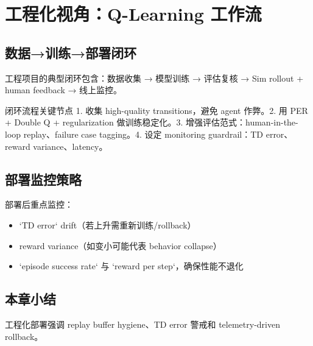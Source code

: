 \section{工程化视角：Q-Learning 工作流}

\subsection{数据→训练→部署闭环}

工程项目的典型闭环包含：数据收集 → 模型训练 → 评估复核 → Sim rollout + human feedback → 线上监控。

\begin{importantbox}{闭环流程关键节点}
1. 收集 high-quality transitions，避免 agent 作弊。2. 用 PER + Double Q + regularization 做训练稳定化。3. 增强评估范式：human-in-the-loop replay、failure case tagging。4. 设定 monitoring guardrail：TD error、reward variance、latency。
\end{importantbox}

\subsection{部署监控策略}

部署后重点监控：

\begin{itemize}
    \item `TD error` drift（若上升需重新训练/rollback）
    \item reward variance（如变小可能代表 behavior collapse）
    \item `episode success rate` 与 `reward per step`，确保性能不退化
\end{itemize}

\subsection{本章小结}

工程化部署强调 replay buffer hygiene、TD error 警戒和 telemetry-driven rollback。

